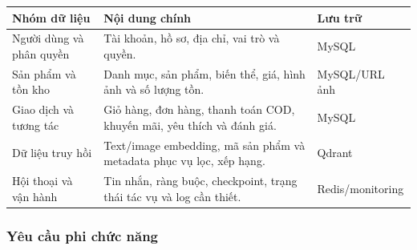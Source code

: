 \begin{breakabletable}
    \centering
    \caption{Các nhóm dữ liệu chính}
    \label{tab:data-requirements}
    \begin{tabularx}{\textwidth}{|p{}|X|>{\RaggedRight\arraybackslash}p{}|}
        \hline
        \textbf{Nhóm dữ liệu} & \textbf{Nội dung chính} & \textbf{Lưu trữ} \\ \hline
        Người dùng và phân quyền & Tài khoản, hồ sơ, địa chỉ, vai trò và quyền. & MySQL \\ \hline
        Sản phẩm và tồn kho & Danh mục, sản phẩm, biến thể, giá, hình ảnh và số lượng tồn. & MySQL/URL ảnh \\ \hline
        Giao dịch và tương tác & Giỏ hàng, đơn hàng, thanh toán COD, khuyến mãi, yêu thích và đánh giá. & MySQL \\ \hline
        Dữ liệu truy hồi & Text/image embedding, mã sản phẩm và metadata phục vụ lọc, xếp hạng. & Qdrant \\ \hline
        Hội thoại và vận hành & Tin nhắn, ràng buộc, checkpoint, trạng thái tác vụ và log cần thiết. & Redis/monitoring \\ \hline
    \end{tabularx}
\end{breakabletable}

\subsubsection{Yêu cầu phi chức năng}

